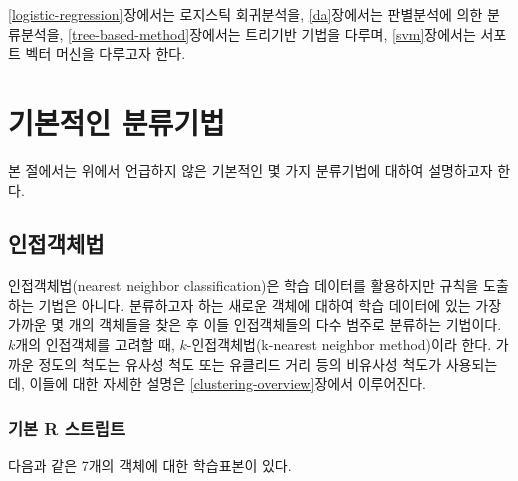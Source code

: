 \documentclass[]{book}
\begin{document}
\ref{logistic-regression}장에서는 로지스틱 회귀분석을, \ref{da}장에서는 판별분석에 의한 분류분석을, \ref{tree-based-method}장에서는 트리기반 기법을 다루며, \ref{svm}장에서는 서포트 벡터 머신을 다루고자 한다.

\hypertarget{simple-classification-methods}{%
\section{기본적인 분류기법}\label{simple-classification-methods}}

본 절에서는 위에서 언급하지 않은 기본적인 몇 가지 분류기법에 대하여 설명하고자 한다.

\hypertarget{nearest-neighbor-classification}{%
\subsection{인접객체법}\label{nearest-neighbor-classification}}

인접객체법(nearest neighbor classification)은 학습 데이터를 활용하지만 규칙을 도출하는 기법은 아니다. 분류하고자 하는 새로운 객체에 대하여 학습 데이터에 있는 가장 가까운 몇 개의 객체들을 찾은 후 이들 인접객체들의 다수 범주로 분류하는 기법이다. \(k\)개의 인접객체를 고려할 때, \(k\)-인접객체법(k-nearest neighbor method)이라 한다. 가까운 정도의 척도는 유사성 척도 또는 유클리드 거리 등의 비유사성 척도가 사용되는데, 이들에 대한 자세한 설명은 \ref{clustering-overview}장에서 이루어진다.

\hypertarget{nearest-neighbor-classificaiton-basic-script}{%
\subsubsection{기본 R 스트립트}\label{nearest-neighbor-classificaiton-basic-script}}

다음과 같은 7개의 객체에 대한 학습표본이 있다.
\end{document}
